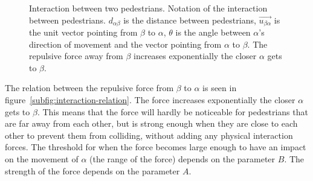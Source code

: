 \begin{figure}[h]
    \centering
    \caption[Interaction between two pedestrians]{Interaction between two 
    pedestrians.  Notation of the 
    interaction between pedestrians. $d_{\alpha \beta}$ is the distance 
    between pedestrians, $\overrightarrow{u_{\beta \alpha}}$ is the unit 
    vector pointing from $\beta$ to $\alpha$, $\theta$ is the angle between 
    $\alpha$'s direction of movement and the vector pointing from $\alpha$ to 
    $\beta$.  The repulsive force away 
    from $\beta$ increases exponentially the closer $\alpha$ gets to $\beta$.}
    \label{fig:pedestrian-interaction}
\end{figure}

The relation between the repulsive force from $\beta$ to $\alpha$ is seen in 
figure~\ref{subfig:interaction-relation}. The force increases exponentially 
the closer $\alpha$ gets to $\beta$. This means that the force will hardly be 
noticeable for pedestrians that are far away from each other, but is strong 
enough when they are close to each other to prevent them from colliding, 
without adding any physical interaction forces. The threshold for when the 
force becomes large enough to have an impact on the movement of $\alpha$ (the 
range of the force) depends on the parameter $B$. The strength of the force 
depends on the parameter $A$.

